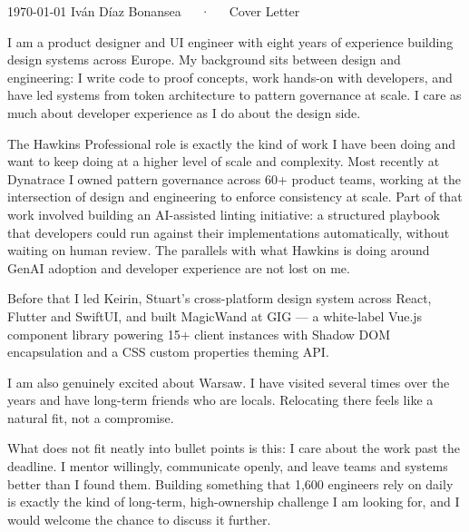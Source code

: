 \documentclass[10pt, a4paper]{awesome-cv}
\begin{document}
\makecvheader[R]

\makecvfooter
  {\today}
  {Iván Díaz Bonansea~~~·~~~Cover Letter}
  {}

\makelettertitle

\begin{cvletter}

I am a product designer and UI engineer with eight years of experience building
design systems across Europe. My background sits between design and engineering:
I write code to proof concepts, work hands-on with developers, and have led
systems from token architecture to pattern governance at scale. I care as much
about developer experience as I do about the design side.

The Hawkins Professional role is exactly the kind of work I have been doing and
want to keep doing at a higher level of scale and complexity. Most recently at
Dynatrace I owned pattern governance across 60+ product teams, working at the
intersection of design and engineering to enforce consistency at scale. Part of
that work involved building an AI-assisted linting initiative: a structured
playbook that developers could run against their implementations automatically,
without waiting on human review. The parallels with what Hawkins is doing around
GenAI adoption and developer experience are not lost on me.

Before that I led Keirin, Stuart's cross-platform design system across React,
Flutter and SwiftUI, and built MagicWand at GIG --- a white-label Vue.js
component library powering 15+ client instances with Shadow DOM encapsulation
and a CSS custom properties theming API.

I am also genuinely excited about Warsaw. I have visited several times over the
years and have long-term friends who are locals. Relocating there feels like a
natural fit, not a compromise.

What does not fit neatly into bullet points is this: I care about the work past
the deadline. I mentor willingly, communicate openly, and leave teams and systems
better than I found them. Building something that 1,600 engineers rely on daily
is exactly the kind of long-term, high-ownership challenge I am looking for, and
I would welcome the chance to discuss it further.

\end{cvletter}

\makeletterclosing
\end{document}
